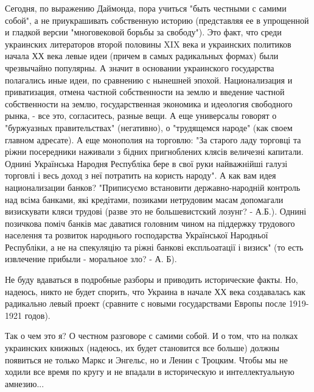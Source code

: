 Сегодня, по выражению Даймонда, пора учиться "быть честными с самими собой", а
не приукрашивать собственную историю (представляя ее в упрощенной и гладкой
версии "многовековой борьбы за свободу"). Это факт, что среди украинских
литераторов второй половины XIX века и украинских политиков начала ХХ века
левые идеи (причем в самых радикальных формах) были чрезвычайно популярны. А
значит в основании украинского государства полагались иные идеи, по сравнению с
нынешней эпохой. Национализация и приватизация, отмена частной собственности на
землю и введение частной собственности на землю, государственная экономика и
идеология свободного рынка, - все это, согласитесь, разные вещи. А еще
универсалы говорят о "буржуазных правительствах" (негативно), о "трудящемся
народе" (как своем главном адресате). А еще монополия на торговлю: "За старого
ладу торговці та ріжни посередники наживали з бідних пригноблених клясів
величезні капитали. Однині Українська Народня Республіка бере в свої руки
найважнійші галузі торговлі і весь доход з неї потратить на користь народу". А
как вам идея национализации банков? "Приписуємо встановити державно-народній
контроль над всіма банками, які кредітами, позиками нетрудовим масам допомагали
визискувати кляси трудові (разве это не большевистский лозунг? - А.Б.). Однині
позичкова поміч банків має даватися головним чином на піддержку трудового
населення та розвиток народнього господарства Української Народньої Республіки,
а не на спекуляцію та ріжні банкові експльоатації і визиск" (то есть извлечение
прибыли - моральное зло? - А. Б). 

Не буду вдаваться в подробные разборы и приводить исторические факты. Но,
надеюсь, никто не будет спорить, что Украина в начале ХХ века создавалась как
радикально левый проект (сравните с новыми государствами Европы после 1919-1921
годов). 

Так о чем это я? О честном разговоре с самими собой. И о том, что на полках
украинских книжных (надеюсь, их будет становится все больше) должны появиться
не только Маркс и Энгельс, но и Ленин с Троцким. Чтобы мы не ходили все время
по кругу и не впадали в историческую и интеллектуальную амнезию...

